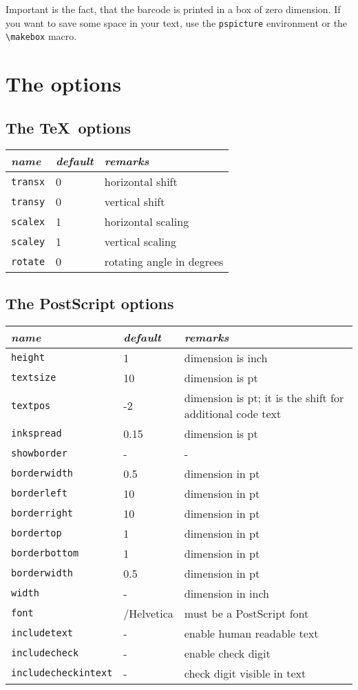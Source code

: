 \documentclass{article}
\begin{document}
Important is the fact, that the barcode is printed in a box of zero dimension.
If you want to save some space in your text, use the \verb+pspicture+ environment
or the \verb+\makebox+ macro.



\section{The options}
\subsection{The \TeX\ options}

\begin{tabular}{@{}lll@{}}
\emph{name} & \emph{default} & \emph{remarks}\\\hline
\verb+transx+ & 0 & horizontal shift\\
\verb+transy+ & 0 & vertical shift\\
\verb+scalex+ & 1 & horizontal scaling\\
\verb+scaley+ & 1 & vertical scaling\\
\verb+rotate+ & 0 & rotating angle in degrees
\end{tabular}

\subsection{The PostScript options}

\begin{tabularx}{\textwidth}{@{}llX@{}}
\emph{name} & \emph{default} & \emph{remarks}\\\hline
\verb+height+ & 1 &  dimension is inch\\
\verb+textsize+ & 10 & dimension is pt\\
\verb+textpos+ & -2 & dimension is pt; it is the shift for additional code text\\
\verb+inkspread+ & 0.15 & dimension is pt\\
\verb+showborder+ & -  & - \\
\verb+borderwidth+ & 0.5  & dimension in pt \\
\verb+borderleft+ & 10  & dimension in pt\\
\verb+borderright+ & 10  & dimension in pt\\
\verb+bordertop+ & 1  & dimension in pt\\
\verb+borderbottom+ & 1  & dimension in pt\\
\verb+borderwidth+ & 0.5  & dimension in pt\\
\verb+width+ & -  & dimension in inch\\
%
\verb+font+ & /Helvetica & must be a PostScript font\\
\verb+includetext+ & - & enable human readable text \\
\verb+includecheck+ & - & enable check digit \\
\verb+includecheckintext+ & - & check digit visible in text
\end{tabularx}
\end{document}
